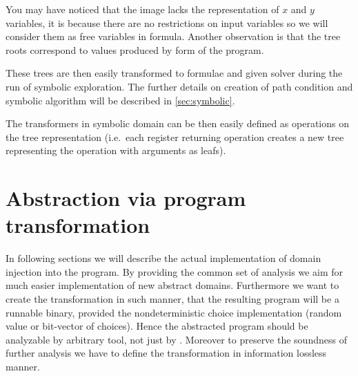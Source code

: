\begin{center}
\begin{minipage}{.4\textwidth}
\end{minipage}
\begin{minipage}{.4\textwidth}
\end{minipage}
\end{center}

You may have noticed that the image lacks the representation of $x$ and $y$
variables, it is because there are no restrictions on input variables so we will
consider them as free variables in formula. Another observation is that the tree
roots correspond to values produced by \SSA form of the program.

These trees are then easily transformed to formulae and given \SMT solver during
the run of symbolic exploration. The further details on creation of path
condition and symbolic algorithm will be described in \autoref{sec:symbolic}.

The transformers in symbolic domain can be then easily defined as operations on
the tree representation (i.e.~each register returning operation creates a new
tree representing the operation with arguments as leafs).

\section{Abstraction via program transformation}

In following sections we will describe the actual implementation of domain
injection into the program. By providing the common set of analysis we aim for
much easier implementation of new abstract domains. Furthermore we want to
create the transformation in such manner, that the resulting program will be a
runnable binary, provided the nondeterministic choice implementation (random
value or bit-vector of choices). Hence the abstracted program should be
analyzable by arbitrary tool, not just by \DIVINE. Moreover to preserve
the soundness of further analysis we have to define the transformation in
information lossless manner.

